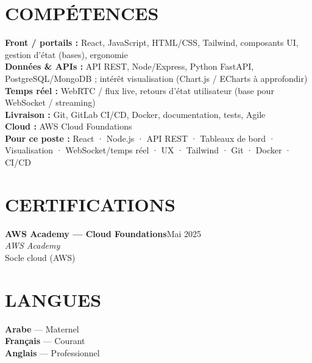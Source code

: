 \documentclass[10pt,a4paper]{article}
\newcommand{\TargetKeywords}{React · Node.js · API REST · Tableaux de bord · Visualisation · WebSocket/temps réel · UX · Tailwind · Git · Docker · CI/CD}
\newcommand{\cert}[4]{%
  \textbf{\color{primary}\small #1}\hfill{\color{muted}\scriptsize #3}\\[-1pt]
  {\color{accent}\small\textit{#2}}\\[0pt]
  {\color{muted}\scriptsize #4}\\[4pt]
}
\begin{document}
\section{COMPÉTENCES}
{\small
\textbf{\color{primary}Front / portails :} React, JavaScript, HTML/CSS, Tailwind, composants UI, gestion d'état (bases), ergonomie\\[2pt]
\textbf{\color{primary}Données \& APIs :} API REST, Node/Express, Python FastAPI, PostgreSQL/MongoDB ; intérêt visualisation (Chart.js / ECharts à approfondir)\\[2pt]
\textbf{\color{primary}Temps réel :} WebRTC / flux live, retours d'état utilisateur (base pour WebSocket / streaming)\\[2pt]
\textbf{\color{primary}Livraison :} Git, GitLab CI/CD, Docker, documentation, tests, Agile\\[2pt]
\textbf{\color{primary}Cloud :} AWS Cloud Foundations\\[2pt]
\textbf{\color{primary}Pour ce poste :} \TargetKeywords
}

\vspace{2pt}
\begin{minipage}[t]{0.65\textwidth}
\section{CERTIFICATIONS}
\cert{AWS Academy — Cloud Foundations}{AWS Academy}{Mai 2025}{Socle cloud (AWS)}
\end{minipage}%
\hfill
\begin{minipage}[t]{0.32\textwidth}
\section{LANGUES}
{\small\textbf{Arabe} — Maternel}\\[2pt]
{\small\textbf{Français} — Courant}\\[2pt]
{\small\textbf{Anglais} — Professionnel}
\end{minipage}
\end{document}
